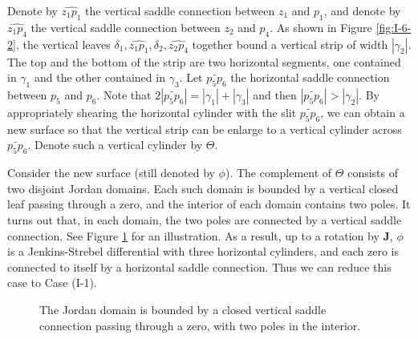 \documentclass[11pt]{amsart}
\theoremstyle{plain}
\newcommand{\rot}{\mathbf{J}}
\begin{document}
Denote by $\widehat{z_1p_1}$ the vertical saddle connection between $z_1$ and $p_1$,
and denote by $\widehat{z_1p_4}$ the vertical saddle connection between $z_2$ and $p_4$.
As shown in Figure \ref{fig:I-6-2}, the vertical leaves $\delta_1, \widehat{z_1p_1}, \delta_2, \widehat{z_2p_4}$ together bound a vertical strip of width $|\gamma_2|$. The top and the bottom of the strip are two horizontal segments, one contained in $\gamma_1$ and the other contained in $\gamma_3$.
Let $\widetilde{p_5p_6}$ the horizontal saddle connection between $p_5$ and $p_6$. Note that 
$2 |\widetilde{p_5p_6}| = |\gamma_1| + |\gamma_3|$ and then $|\widetilde{p_5p_6}|>|\gamma_2|$. 
By  appropriately shearing the horizontal cylinder with the slit $\widetilde{p_5p_6}$, we can obtain a new surface so that the vertical strip can be enlarge to a vertical cylinder across $\widetilde{p_5p_6}$. Denote such a vertical cylinder by
$\Theta$.

Consider the new surface (still denoted by $\phi$). The complement of $\Theta$ consists of two disjoint Jordan domains. Each such domain is bounded by a vertical closed leaf passing through a zero, and the interior of each domain contains two poles. It turns out that,  in each domain, the two poles are connected by a vertical saddle connection. See Figure \ref{fig:I-3-b-2} for an illustration.
As a result, up to a rotation by $\rot$,
$\phi$ is a Jenkins-Strebel differential with three horizontal cylinders, and each zero is connected to itself by a horizontal saddle connection. Thus we can reduce this case to Case (I-1). 


\begin{figure}
    \centering
   \caption{The Jordan domain is bounded by a closed vertical saddle connection passing through a zero, with two poles in the interior.}
   \label{fig:I-3-b-2}
\end{figure}






\end{document}
